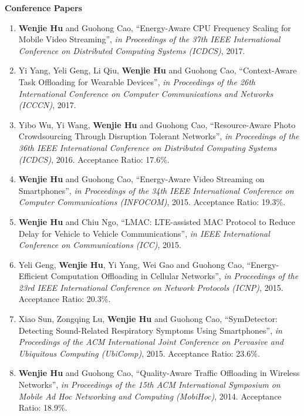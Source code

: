\documentclass[margin,line]{res}
\begin{document}
\begin{resume}
{\bf Conference Papers}
\vspace*{.05in}
\begin{enumerate} [leftmargin=5mm]%
\item {\bf Wenjie Hu} and Guohong Cao, ``Energy-Aware CPU Frequency Scaling for Mobile Video Streaming'', {\em in Proceedings of the 37th IEEE International Conference on Distributed Computing Systems (ICDCS)}, 2017.
\item Yi Yang, Yeli Geng, Li Qiu, {\bf Wenjie Hu} and Guohong Cao, ``Context-Aware Task Offloading for Wearable Devices'', {\em in Proceedings of the 26th International Conference on Computer Communications and Networks (ICCCN)}, 2017.
\item Yibo Wu, Yi Wang, {\bf Wenjie Hu} and Guohong Cao, ``Resource-Aware Photo Crowdsourcing Through Disruption Tolerant Networks'', {\em in Proceedings of the 36th IEEE International Conference on Distributed Computing Systems (ICDCS)}, 2016. Acceptance Ratio: 17.6\%. %
\item {\bf Wenjie Hu} and Guohong Cao, ``Energy-Aware Video Streaming on Smartphones'', {\it in Proceedings of the 34th IEEE International Conference on Computer Communications (INFOCOM)}, 2015. Acceptance Ratio: 19.3\%.%
\item {\bf Wenjie Hu} and Chiu Ngo, ``LMAC: LTE-assisted MAC Protocol to Reduce Delay for Vehicle to Vehicle Communications'', {\em in IEEE International Conference on Communications (ICC)}, 2015. %
\item Yeli Geng, {\bf Wenjie Hu}, Yi Yang, Wei Gao and Guohong Cao, ``Energy-Efficient Computation Offloading in Cellular Networks'', {\it in Proceedings of the 23rd IEEE International Conference on Network Protocols (ICNP)}, 2015. Acceptance Ratio: 20.3\%.%
\item Xiao Sun, Zongqing Lu, {\bf Wenjie Hu} and Guohong Cao, ``SymDetector: Detecting Sound-Related Respiratory Symptoms Using Smartphones'', {\it in Proceedings of the ACM International Joint Conference on Pervasive and Ubiquitous Computing (UbiComp)}, 2015. Acceptance Ratio: 23.6\%.%
\item  {\bf Wenjie Hu} and Guohong Cao, ``Quality-Aware Traffic Offloading in Wireless Networks'', {\em in Proceedings of the 15th ACM International Symposium on Mobile Ad Hoc Networking and Computing (MobiHoc)}, 2014. Acceptance Ratio: 18.9\%.%

\end{enumerate}
\end{resume}
\end{document}

